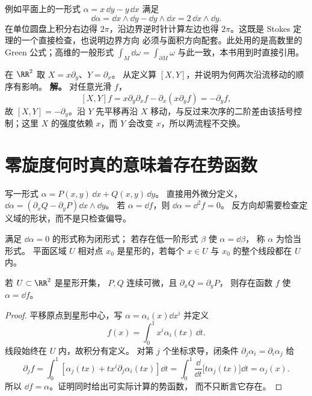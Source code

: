 例如平面上的一形式 \(\alpha=x\,\dd y-y\,\dd x\) 满足
\[
\dd\alpha=\dd x\wedge \dd y-\dd y\wedge \dd x=2\,\dd x\wedge \dd y.
\]
在单位圆盘上积分右边得 \(2\pi\)，沿边界逆时针计算左边也得
\(2\pi\)。这既是 Stokes 定理的一个直接检查，也说明边界方向
必须与面积方向配套。此处用的是高数里的 Green 公式；高维的一般形式
\(\int_M\dd\omega=\int_{\partial M}\omega\) 与此一致，本书用到时直接引用。


\par
\begin{workedexample}
在 \(\RR^2\) 取 \(X=x\partial_y\)、\(Y=\partial_x\)。
从定义算 \([X,Y]\)，并说明为何两次沿流移动的顺序有影响。
\textbf{解。} 对任意光滑 \(f\)，
\[
[X,Y]f=x\partial_y\partial_x f-\partial_x(x\partial_yf)=-\partial_yf,
\]
故 \([X,Y]=-\partial_y\)。沿 \(Y\) 先平移再沿 \(X\) 移动，与反过来次序的二阶差由该括号控制；这里 \(X\) 的强度依赖 \(x\)，而 \(Y\) 会改变 \(x\)，所以两流程不交换。
\end{workedexample}
\par
\section{零旋度何时真的意味着存在势函数}

写一形式 \(\alpha=P(x,y)\,\dd x+Q(x,y)\,\dd y\)。
直接用外微分定义，
\(\dd\alpha=(\partial_xQ-\partial_yP)\dd x\wedge \dd y\)。
若 \(\alpha=\dd f\)，则 \(\dd\alpha=\dd^2f=0\)。
反方向却需要检查定义域的形状，而不是只检查偏导。

\begin{definition}
满足 \(\dd\alpha=0\) 的形式称为闭形式；
若存在低一阶形式 \(\beta\) 使 \(\alpha=\dd\beta\)，
称 \(\alpha\) 为恰当形式。
平面区域 \(U\) 相对点 \(x_0\) 是星形的，若每个
\(x\in U\) 与 \(x_0\) 的整个线段都在 \(U\) 内。
\end{definition}

\begin{theorem}
若 \(U\subset\RR^2\) 是星形开集，
\(P,Q\) 连续可微，且 \(\partial_xQ=\partial_yP\)，
则存在函数 \(f\) 使 \(\alpha=\dd f\)。
\end{theorem}
\begin{proof}
平移原点到星形中心，写 \(\alpha=\alpha_i(x)\dd x^i\) 并定义
\[
f(x)=\int_0^1 x^i\alpha_i(tx)\,\dd t.
\]
线段始终在 \(U\) 内，故积分有定义。
对第 \(j\) 个坐标求导，闭条件
\(\partial_j\alpha_i=\partial_i\alpha_j\) 给
\[
\partial_j f
=\int_0^1\left[\alpha_j(tx)
+t x^i\partial_j\alpha_i(tx)\right]\dd t
=\int_0^1\frac{\dd}{\dd t}\bigl[t\alpha_j(tx)\bigr]\dd t
=\alpha_j(x).
\]
所以 \(\dd f=\alpha\)。证明同时给出可实际计算的势函数，
而不只断言它存在。
\end{proof}

